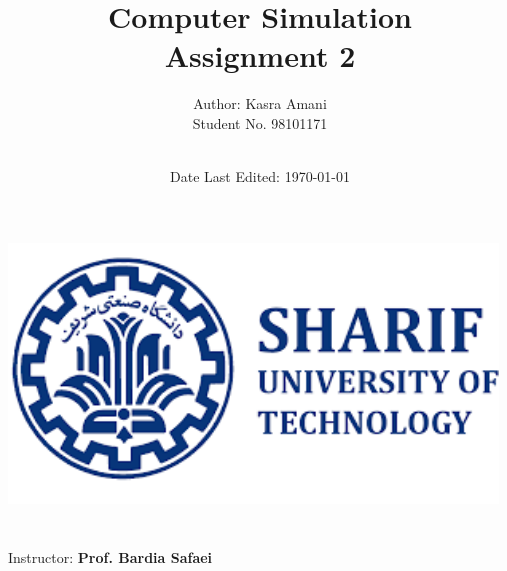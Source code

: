 \title{\Large Computer Simulation  \\[0.5cm]
        \bf\Large Assignment 2}
\author{\large Author: Kasra Amani\\ \normalsize Student No. 98101171 \\ \ \\}
\date{\large Date Last Edited: \today}

\makeatletter
    \begin{titlepage}
        \begin{center}
	   { \includegraphics[width=13cm]{sharif.png}}
	   {\ \\ \ \\}
        \vbox{}\vspace{5cm}
            {\@title }\\[3cm] 
            {\@author}
            {\large Instructor: \bf Prof. Bardia Safaei\\ \ \\}
            {\@date\\}

        \end{center}
    \end{titlepage}
\makeatother
